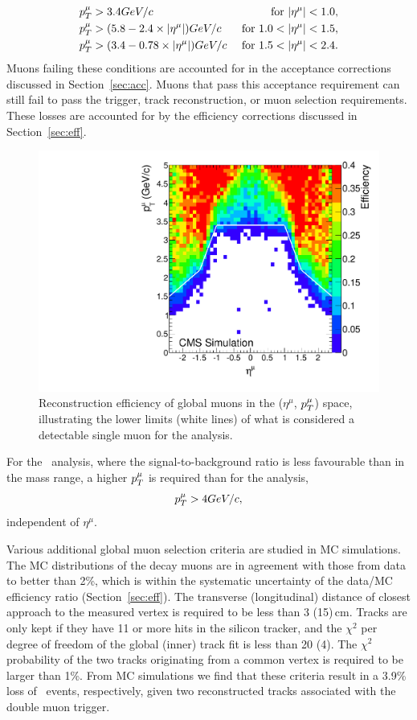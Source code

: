 \begin{align}\label{eq:singleMuonAcc}
    p_T^{\mu} &> 3.4GeV/c &\text{ for } |\eta^{\mu}| < 1.0, \notag\\
    p_T^{\mu} &> (5.8 - 2.4\times|\eta^{\mu}|)GeV/c &\text{ for } 1.0 < |\eta^{\mu}| < 1.5,\\
    p_T^{\mu} &> (3.4 - 0.78\times|\eta^{\mu}|)GeV/c &\text{ for } 1.5 < |\eta^{\mu}| < 2.4. \notag
  \end{align}
Muons failing these conditions are accounted for in the acceptance
corrections discussed in Section~\ref{sec:acc}. Muons that pass this
acceptance requirement can still fail to pass the trigger, track
reconstruction, or muon selection requirements. These losses are
accounted for by the efficiency corrections discussed in
Section~\ref{sec:eff}.
\begin{figure}[htbp]
  \centering
  \includegraphics[width=0.5\linewidth]{chap_YInPbPbColl2010_figures/muPtEtaDoable}
  \caption{Reconstruction efficiency of global muons in the ($\eta^{\mu}$,
    $p_T^{\mu}$) space, illustrating the lower limits (white lines) of
    what is considered a detectable single muon for the analysis.}
  \label{fig:muPtEtaDoable}
\end{figure}

For the \PgUa\ analysis, where the signal-to-background ratio is less
favourable than in the \Jpsi mass range, a higher $p_T^{\mu}$ is
required than for the \Jpsi analysis,
\begin{equation}
  \label{eq:singleMuonAccUps}
    p_T^{\mu}>4GeV/c,
\end{equation}
independent of $\eta^{\mu}$.

Various additional global muon selection criteria are studied in MC
simulations. The MC distributions of the \Jpsi decay muons are in
agreement with those from data to better than 2\%, which is within the
systematic uncertainty of the data/MC efficiency ratio
(Section~\ref{sec:eff}). The transverse (longitudinal) distance of
closest approach to the measured vertex is required to be less than 3
(15)\,cm. Tracks are only kept if they have 11 or more hits in the
silicon tracker, and the $\chi^2$ per degree of freedom of the global
(inner) track fit is less than 20 (4). The $\chi^2$ probability of the
two tracks originating from a common vertex is required to be larger
than 1\%. From MC simulations we find that these criteria result in a
3.9\% loss of \PgUa\ events, respectively, given two reconstructed 
tracks associated with the double muon trigger.

